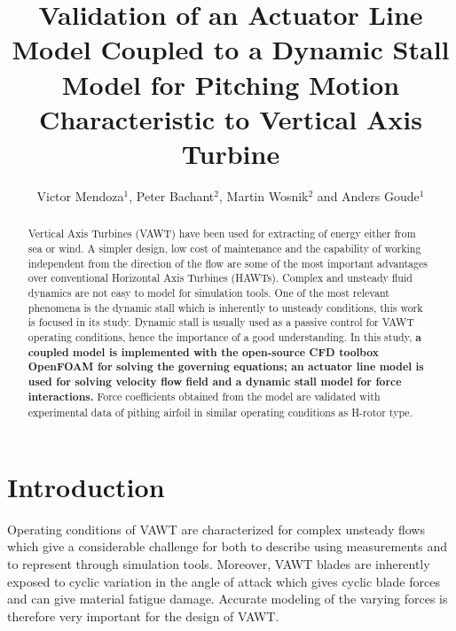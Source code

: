 \documentclass[a4paper]{jpconf}
\begin{document}
\title{Validation of an Actuator Line Model Coupled to a Dynamic Stall Model for Pitching Motion Characteristic to Vertical Axis Turbine} %
\author{Victor Mendoza$^{1}$, Peter Bachant$^{2}$, Martin Wosnik$^{2}$ and Anders Goude$^{1}$ }
\address{$^{1}$ Department of Engineering Sciences, Division of Electricity, Uppsala University, \\Uppsala 751 21, Sweden}
\address{$^{2}$ Center for Ocean Renewable Energy, University of New Hampshire, 24 Colovos Rd.,\\ Durham, NH 03824, USA}




\begin{abstract}

    Vertical Axis Turbines (VAWT) have been used for extracting of energy either
    from sea or wind. A simpler design, low cost of maintenance and the
    capability of working independent from the direction of the flow are some of
    the most important advantages over conventional Horizontal Axis Turbines
    (HAWTs). Complex and unsteady fluid dynamics are not easy to model for
    simulation tools. One of the most relevant phenomena is the dynamic stall
    which is inherently to unsteady conditions, this work is focused in its
    study. Dynamic stall is usually used as a passive control for VAWT operating
    conditions, hence the importance of a good understanding. In this study,
    \textbf{a coupled model is implemented with the open-source CFD toolbox
    OpenFOAM for solving the governing equations; an actuator line model is used
    for solving velocity flow field and a dynamic stall model for force
    interactions.} Force coefficients obtained from the model are validated with
    experimental data of pithing airfoil in similar operating conditions as
    H-rotor type.

\end{abstract}



\section{Introduction}

Operating conditions of VAWT are characterized for complex unsteady flows which
give a considerable challenge for both to describe using measurements and to
represent through simulation tools\cite{huyer1996unsteady}. Moreover, VAWT
blades are inherently exposed to cyclic variation in the angle of attack which
gives cyclic blade forces and can give material fatigue damage. Accurate
modeling of the varying forces is therefore very important for the design of
VAWT.
\end{document}
